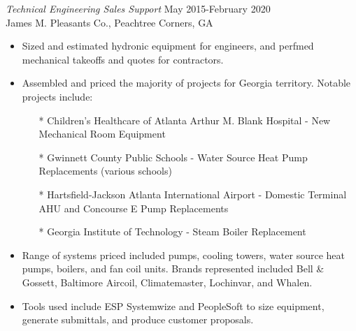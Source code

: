 \documentclass[margin]{res}
\begin{document}
\begin{resume}
    {\sl Technical Engineering Sales Support} \hfill May 2015-February 2020 \\
        James M. Pleasants Co., Peachtree Corners, GA
        \begin{itemize}  \itemsep -2pt %
            \item Sized and estimated hydronic equipment for engineers, and perfmed mechanical takeoffs and quotes for contractors.
            \item Assembled and priced the majority of projects for Georgia territory. Notable projects include:
              \begin{itemize}
              \item[*] Children's Healthcare of Atlanta Arthur M. Blank Hospital - New Mechanical Room Equipment
              \item[*] Gwinnett County Public Schools - Water Source Heat Pump Replacements (various schools)
              \item[*] Hartsfield-Jackson Atlanta International Airport - Domestic Terminal AHU and Concourse E Pump Replacements
              \item[*] Georgia Institute of Technology - Steam Boiler Replacement
              \end{itemize}
            \item Range of systems priced included pumps, cooling towers, water source heat pumps, boilers, and fan coil units. Brands represented included Bell \& Gossett, Baltimore Aircoil, Climatemaster, Lochinvar, and Whalen.
            \item Tools used include ESP Systemwize and PeopleSoft to size equipment, generate submittals, and produce customer proposals.
            \end{itemize}
 


\end{resume}
\end{document}
